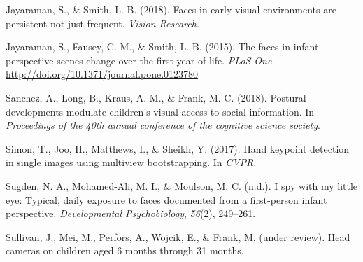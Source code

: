\documentclass[10pt, letterpaper]{article}
\begin{document}
\hypertarget{ref-Jayaraman2018}{}
Jayaraman, S., \& Smith, L. B. (2018). Faces in early visual
environments are persistent not just frequent. \emph{Vision Research}.

\hypertarget{ref-Jayaraman2015}{}
Jayaraman, S., Fausey, C. M., \& Smith, L. B. (2015). The faces in
infant-perspective scenes change over the first year of life. \emph{PLoS
One}. \url{http://doi.org/10.1371/journal.pone.0123780}

\hypertarget{ref-Sanchez2018}{}
Sanchez, A., Long, B., Kraus, A. M., \& Frank, M. C. (2018). Postural
developments modulate children's visual access to social information. In
\emph{Proceedings of the 40th annual conference of the cognitive science
society}.

\hypertarget{ref-Simon2017hand}{}
Simon, T., Joo, H., Matthews, I., \& Sheikh, Y. (2017). Hand keypoint
detection in single images using multiview bootstrapping. In
\emph{CVPR}.

\hypertarget{ref-Sugden2014}{}
Sugden, N. A., Mohamed-Ali, M. I., \& Moulson, M. C. (n.d.). I spy with
my little eye: Typical, daily exposure to faces documented from a
first-person infant perspective. \emph{Developmental Psychobiology},
\emph{56}(2), 249--261.

\hypertarget{ref-SAYcam}{}
Sullivan, J., Mei, M., Perfors, A., Wojcik, E., \& Frank, M. (under
review). Head cameras on children aged 6 months through 31 months.


\end{document}
